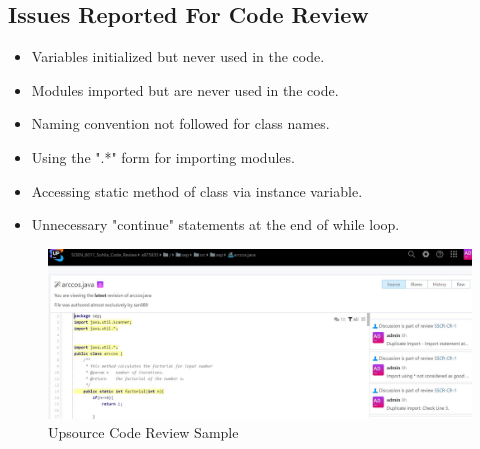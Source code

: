 \documentclass[a4paper,12pt]{article}
\begin{document}
\subsection{Issues Reported For Code Review}
\begin{itemize}
	\item Variables initialized but never used in the code.
	\item Modules imported but are never used in the code.
	\item Naming convention not followed for class names.
	\item Using the ".*" form for importing modules.
	\item Accessing static method of class via instance variable.
	\item Unnecessary "continue" statements at the end of while loop.
\end{itemize}

\begin{figure}[htp]
	\centering
	\includegraphics[scale=0.5]{sample_review.jpg}
	\caption{Upsource Code Review Sample}
	\label{fig:galaxy}
\end{figure}
\end{document}
